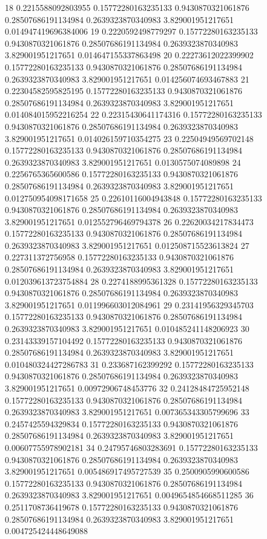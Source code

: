 {18 0.2215588092803955 0.15772280163235133 0.9430870321061876 0.28507686191134984 0.2639323870340983 3.829001951217651 0.014947419696384006
19 0.2220592498779297 0.15772280163235133 0.9430870321061876 0.28507686191134984 0.2639323870340983 3.829001951217651 0.014647155337863498
20 0.22273612022399902 0.15772280163235133 0.9430870321061876 0.28507686191134984 0.2639323870340983 3.829001951217651 0.014256074693467883
21 0.22304582595825195 0.15772280163235133 0.9430870321061876 0.28507686191134984 0.2639323870340983 3.829001951217651 0.014084015952216254
22 0.22315430641174316 0.15772280163235133 0.9430870321061876 0.28507686191134984 0.2639323870340983 3.829001951217651 0.014026159710354275
23 0.22504949569702148 0.15772280163235133 0.9430870321061876 0.28507686191134984 0.2639323870340983 3.829001951217651 0.0130575074089898
24 0.2256765365600586 0.15772280163235133 0.9430870321061876 0.28507686191134984 0.2639323870340983 3.829001951217651 0.012750954098171658
25 0.22610116004943848 0.15772280163235133 0.9430870321061876 0.28507686191134984 0.2639323870340983 3.829001951217651 0.012552796469794378
26 0.22620034217834473 0.15772280163235133 0.9430870321061876 0.28507686191134984 0.2639323870340983 3.829001951217651 0.012508715523613824
27 0.227311372756958 0.15772280163235133 0.9430870321061876 0.28507686191134984 0.2639323870340983 3.829001951217651 0.012039613723754884
28 0.2274188995361328 0.15772280163235133 0.9430870321061876 0.28507686191134984 0.2639323870340983 3.829001951217651 0.011996603012084961
29 0.23141956329345703 0.15772280163235133 0.9430870321061876 0.28507686191134984 0.2639323870340983 3.829001951217651 0.010485241148206923
30 0.23143339157104492 0.15772280163235133 0.9430870321061876 0.28507686191134984 0.2639323870340983 3.829001951217651 0.010480324427286783
31 0.233687162399292 0.15772280163235133 0.9430870321061876 0.28507686191134984 0.2639323870340983 3.829001951217651 0.00972906748453776
32 0.24128484725952148 0.15772280163235133 0.9430870321061876 0.28507686191134984 0.2639323870340983 3.829001951217651 0.007365343305799696
33 0.2457425594329834 0.15772280163235133 0.9430870321061876 0.28507686191134984 0.2639323870340983 3.829001951217651 0.00607755978902181
34 0.24795746803283691 0.15772280163235133 0.9430870321061876 0.28507686191134984 0.2639323870340983 3.829001951217651 0.005486917495727539
35 0.2500905990600586 0.15772280163235133 0.9430870321061876 0.28507686191134984 0.2639323870340983 3.829001951217651 0.0049654854668511285
36 0.2511708736419678 0.15772280163235133 0.9430870321061876 0.28507686191134984 0.2639323870340983 3.829001951217651 0.004725424448649088
}
